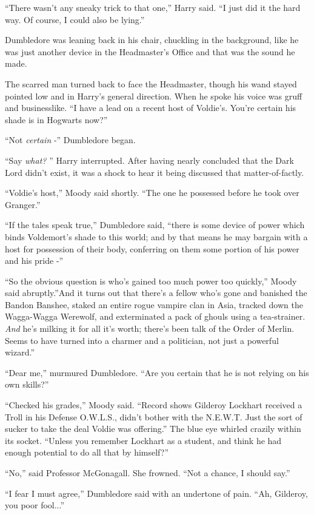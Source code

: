 ``There wasn't any sneaky trick to that one,'' Harry said. ``I just did
it the hard way. Of course, I could also be lying.''

Dumbledore was leaning back in his chair, chuckling in the background,
like he was just another device in the Headmaster's Office and that was
the sound he made.

The scarred man turned back to face the Headmaster, though his wand
stayed pointed low and in Harry's general direction. When he spoke his
voice was gruff and businesslike. ``I have a lead on a recent host of
Voldie's. You're certain his shade is in Hogwarts now?''

``Not \emph{certain} -'' Dumbledore began.

``Say \emph{what?} '' Harry interrupted. After having nearly concluded
that the Dark Lord didn't exist, it was a shock to hear it being
discussed that matter-of-factly.

``Voldie's host,'' Moody said shortly. ``The one he possessed before he
took over Granger.''

``If the tales speak true,'' Dumbledore said, ``there is some device of
power which binds Voldemort's shade to this world; and by that means he
may bargain with a host for possession of their body, conferring on them
some portion of his power and his pride -''

``So the obvious question is who's gained too much power too quickly,''
Moody said abruptly.''And it turns out that there's a fellow who's gone
and banished the Bandon Banshee, staked an entire rogue vampire clan in
Asia, tracked down the Wagga-Wagga Werewolf, and exterminated a pack of
ghouls using a tea-strainer. \emph{And} he's milking it for all it's
worth; there's been talk of the Order of Merlin. Seems to have turned
into a charmer and a politician, not just a powerful wizard.''

``Dear me,'' murmured Dumbledore. ``Are you certain that he is not
relying on his own skills?''

``Checked his grades,'' Moody said. ``Record shows Gilderoy Lockhart
received a Troll in his Defense O.W.L.S., didn't bother with the
N.E.W.T. Just the sort of sucker to take the deal Voldie was offering.''
The blue eye whirled crazily within its socket. ``Unless you remember
Lockhart as a student, and think he had enough potential to do all that
by himself?''

``No,'' said Professor McGonagall. She frowned. ``Not a chance, I should
say.''

``I fear I must agree,'' Dumbledore said with an undertone of pain.
``Ah, Gilderoy, you poor fool...''

